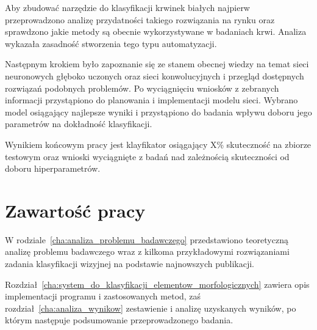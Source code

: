 Aby zbudować narzędzie do klasyfikacji krwinek białych najpierw przeprowadzono analizę przydatności takiego rozwiązania na rynku oraz sprawdzono jakie metody są obecnie wykorzystywane w badaniach krwi. Analiza wykazała zasadność stworzenia tego typu automatyzacji.

Następnym krokiem było zapoznanie się ze stanem obecnej wiedzy na temat sieci neuronowych głęboko uczonych oraz sieci konwolucyjnych i przegląd dostępnych rozwiązań podobnych problemów. Po wyciągnięciu wniosków z zebranych informacji przystąpiono do planowania i implementacji modelu sieci. Wybrano model osiągający najlepsze wyniki i przystąpiono do badania wpływu doboru jego parametrów na dokładność klasyfikacji.

Wynikiem końcowym pracy jest klayfikator osiągający X\% skuteczność na zbiorze testowym oraz wnioski wyciągnięte z badań nad zależnością skuteczności od doboru hiperparametrów.

\section{Zawartość pracy}
\label{sec:zawartosc_pracy}

W rodziale~\ref{cha:analiza_problemu_badawczego} przedstawiono teoretyczną analizę problemu badawczego wraz z kilkoma przykładowymi rozwiązaniami zadania klasyfikacji wizyjnej na podstawie najnowszych publikacji. 

Rozdział~\ref{cha:system_do_klasyfikacji_elementow_morfologicznych} zawiera opis implementacji programu i zastosowanych metod, zaś rozdział~\ref{cha:analiza_wynikow} zestawienie i analizę uzyskanych wyników, po którym następuje podsumowanie przeprowadzonego badania.
